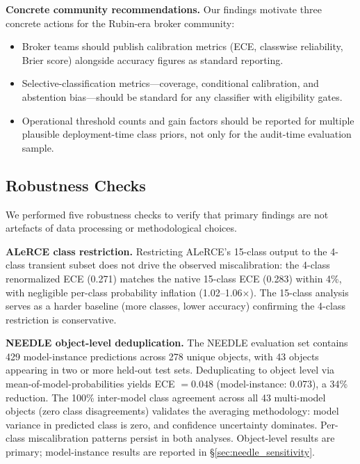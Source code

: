 \documentclass[twocolumn]{aastex631}
\begin{document}
\textbf{Concrete community recommendations.} Our findings motivate three
concrete actions for the Rubin-era broker community:
\begin{itemize}
  \item Broker teams should publish calibration metrics (ECE, classwise
        reliability, Brier score) alongside accuracy figures as
        standard reporting.
  \item Selective-classification metrics---coverage, conditional
        calibration, and abstention bias---should be standard for any
        classifier with eligibility gates.
  \item Operational threshold counts and gain factors should be reported
        for multiple plausible deployment-time class priors, not only
        for the audit-time evaluation sample.
\end{itemize}

\subsection{Robustness Checks} \label{sec:robustness}

We performed five robustness checks to verify that primary findings are not artefacts of data processing or methodological choices.

\textbf{ALeRCE class restriction.} Restricting ALeRCE's 15-class output to the 4-class transient subset does not drive the observed miscalibration: the 4-class renormalized ECE (0.271) matches the native 15-class ECE (0.283) within 4\%, with negligible per-class probability inflation (1.02--1.06$\times$). The 15-class analysis serves as a harder baseline (more classes, lower accuracy) confirming the 4-class restriction is conservative.

\textbf{NEEDLE object-level deduplication.} The NEEDLE evaluation set contains 429 model-instance predictions across 278 unique objects, with 43 objects appearing in two or more held-out test sets. Deduplicating to object level via mean-of-model-probabilities yields ECE $= 0.048$ (model-instance: 0.073), a 34\% reduction. The 100\% inter-model class agreement across all 43 multi-model objects (zero class disagreements) validates the averaging methodology: model variance in predicted class is zero, and confidence uncertainty dominates. Per-class miscalibration patterns persist in both analyses. Object-level results are primary; model-instance results are reported in \S\ref{sec:needle_sensitivity}.
\end{document}
